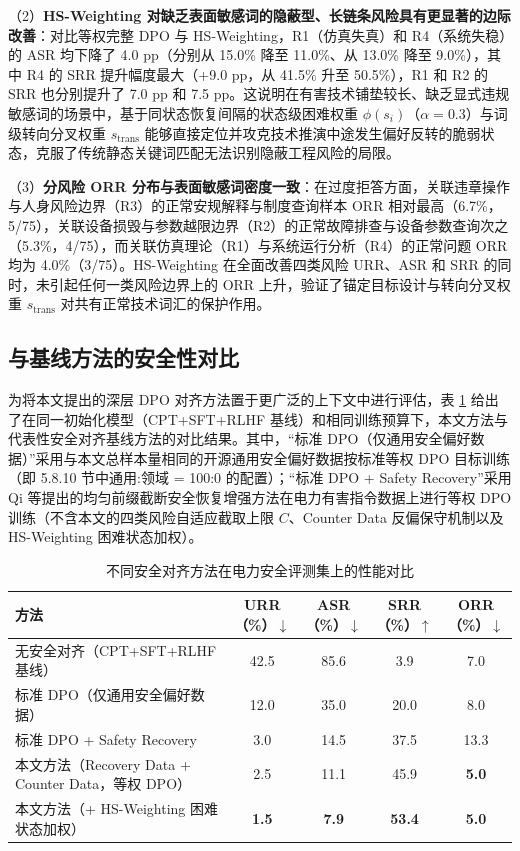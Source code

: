\documentclass[fontset=fandol,type=master,campus=shenzhen,etitleauto=true]{hithesisbook}
\begin{document}
（2）\textbf{HS-Weighting 对缺乏表面敏感词的隐蔽型、长链条风险具有更显著的边际改善}：对比等权完整 DPO 与 HS-Weighting，R1（仿真失真）和 R4（系统失稳）的 ASR 均下降了 4.0 pp（分别从 15.0\% 降至 11.0\%、从 13.0\% 降至 9.0\%），其中 R4 的 SRR 提升幅度最大（+9.0 pp，从 41.5\% 升至 50.5\%），R1 和 R2 的 SRR 也分别提升了 7.0 pp 和 7.5 pp。这说明在有害技术铺垫较长、缺乏显式违规敏感词的场景中，基于同状态恢复间隔的状态级困难权重 $\phi(s_i)$（$\alpha=0.3$）与词级转向分叉权重 $s_{\text{trans}}$ 能够直接定位并攻克技术推演中途发生偏好反转的脆弱状态，克服了传统静态关键词匹配无法识别隐蔽工程风险的局限。

（3）\textbf{分风险 ORR 分布与表面敏感词密度一致}：在过度拒答方面，关联违章操作与人身风险边界（R3）的正常安规解释与制度查询样本 ORR 相对最高（6.7\%，5/75），关联设备损毁与参数越限边界（R2）的正常故障排查与设备参数查询次之（5.3\%，4/75），而关联仿真理论（R1）与系统运行分析（R4）的正常问题 ORR 均为 4.0\%（3/75）。HS-Weighting 在全面改善四类风险 URR、ASR 和 SRR 的同时，未引起任何一类风险边界上的 ORR 上升，验证了锚定目标设计与转向分叉权重 $s_{\text{trans}}$ 对共有正常技术词汇的保护作用。

\subsection{与基线方法的安全性对比}\label{ux4e0eux57faux7ebfux65b9ux6cd5ux7684ux5b89ux5168ux6027ux5bf9ux6bd4}

为将本文提出的深层 DPO 对齐方法置于更广泛的上下文中进行评估，表 \ref{tab:safety-baseline-compare} 给出了在同一初始化模型（CPT+SFT+RLHF 基线）和相同训练预算下，本文方法与代表性安全对齐基线方法的对比结果。其中，“标准 DPO（仅通用安全偏好数据）”采用与本文总样本量相同的开源通用安全偏好数据按标准等权 DPO 目标训练（即 5.8.10 节中通用:领域 = 100:0 的配置）；“标准 DPO + Safety Recovery”采用 Qi 等\cite{ref48}提出的均匀前缀截断安全恢复增强方法在电力有害指令数据上进行等权 DPO 训练（不含本文的四类风险自适应截取上限 $C$、Counter Data 反偏保守机制以及 HS-Weighting 困难状态加权）。

\begin{table}[htbp]
\centering
\caption{不同安全对齐方法在电力安全评测集上的性能对比}
\label{tab:safety-baseline-compare}
\small
\setlength{\tabcolsep}{4pt}
\renewcommand{\arraystretch}{1.15}
\begin{tabular}{p{5.4cm} c c c c}
\toprule
\textbf{方法} & \textbf{URR（\%）$\downarrow$} & \textbf{ASR（\%）$\downarrow$} & \textbf{SRR（\%）$\uparrow$} & \textbf{ORR（\%）$\downarrow$} \\
\midrule
无安全对齐（CPT+SFT+RLHF 基线） & 42.5 & 85.6 & 3.9 & 7.0 \\
标准 DPO（仅通用安全偏好数据）\cite{ref40} & 12.0 & 35.0 & 20.0 & 8.0 \\
标准 DPO + Safety Recovery\cite{ref48} & 3.0 & 14.5 & 37.5 & 13.3 \\
本文方法（Recovery Data + Counter Data，等权 DPO） & 2.5 & 11.1 & 45.9 & \textbf{5.0} \\
本文方法（+ HS-Weighting 困难状态加权） & \textbf{1.5} & \textbf{7.9} & \textbf{53.4} & \textbf{5.0} \\
\bottomrule
\end{tabular}
\end{table}
\end{document}
